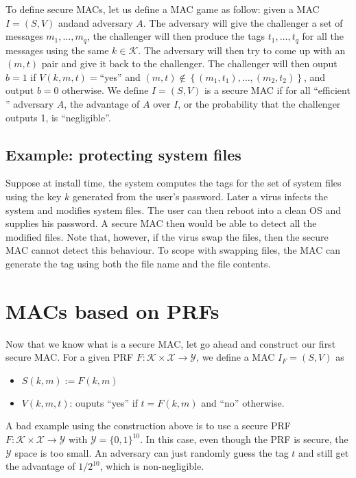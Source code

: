 \documentclass{article}
\begin{document}
To define secure MACs, let us define a MAC game as follow: given a MAC $I = (S,
V)$ andand adversary $A$. The adversary will give the challenger a set of
messages $m_1, \dotsc, m_q$, the challenger will then produce the tags $t_1,
\dotsc, t_q$ for all the messages using the same $k \in \mathcal{K}$. The
adversary will then try to come up with an $(m, t)$ pair and give it back to the
challenger. The challenger will then ouput $b = 1$ if $V(k, m, t) = $``yes''
and $(m, t) \notin \left\lbrace (m_1, t_1), \dotsc, (m_2, t_2) \right\rbrace$,
and output $b=0$ otherwise. We define $I = (S, V)$ is a secure MAC if for all
``efficient '' adversary $A$, the advantage of $A$ over $I$, or the probability
that the challenger outputs 1, is ``negligible''.

\subsection{Example: protecting system files}
Suppose at install time, the system computes the tags for the set of system
files using the key $k$ generated from the user's password. Later a virus
infects the system and modifies system files. The user can then reboot into a
clean OS and supplies his password. A secure MAC then would be able to detect
all the modified files. Note that, however, if the virus swap the files, then
the secure MAC cannot detect this behaviour. To scope with swapping files, the
MAC can generate the tag using both the file name and the file contents.

\section{MACs based on PRFs}

Now that we know what is a secure MAC, let go ahead and construct our first
secure MAC. For a given PRF $F: \mathcal{K} \times \mathcal{X} \to \mathcal{Y}$,
we define a MAC $I_F = (S, V)$ as
\begin{itemize}
\item $S(k, m) := F(k,m)$
\item $V(k, m, t)$: ouputs ``yes'' if $t = F(k, m)$ and ``no'' otherwise.
\end{itemize}

A bad example using the construction above is to use a secure PRF $F:
\mathcal{K} \times \mathcal{X} \to \mathcal{Y}$ with $\mathcal{Y} = \lbrace 0, 1
\rbrace^{10}$. In this case, even though the PRF is secure, the $\mathcal{Y}$
space is too small. An adversary can just randomly guess the tag $t$ and still
get the advantage of $1 / 2^{10}$, which is non-negligible.
\end{document}
